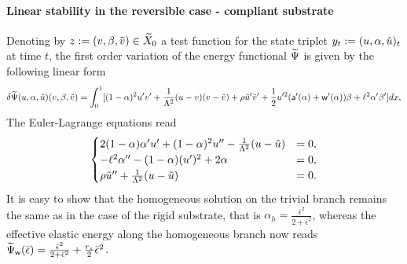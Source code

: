  \paragraph{Linear stability in the reversible case - compliant substrate}



Denoting by $z:=(v, \beta, \tilde v)\in \widetilde{X}_0$ a test function for the state triplet  $y_t:=(u, \alpha, \tilde u)_t$ at time $t$, the first order variation of the energy functional $\widetilde\Psi$ is given by the following linear form 
\begin{equation}
\delta \widetilde\Psi(u, \alpha, \tilde u)(v,\beta,\tilde v)=\int_0^1 [(1-\alpha)^2u'v'+\frac{1}{\Lambda^2} (u- v) (v- \tilde v)+\rho \tilde u'\tilde v'+\frac{1}{2}u'^2 (\mathsf{a}'(\alpha)+\mathsf{w}'(\alpha))\beta+\ell^2\alpha'\beta' ]dx,\label{firstvar}
\end{equation}
The Euler-Lagrange equations read
\begin{eqnarray}
\label{modeld_el_1}
\begin{cases}
  2(1-\alpha)\alpha' u' +(1-\alpha)^2 u'' -  \frac{1}{\Lambda^2}(u-\tilde u) &= 0, \\
  -\ell^2\alpha'' - (1-\alpha)( u')^2 + 2\alpha   &= 0,\\
    \rho  \tilde u''  +  \frac{1}{\Lambda^2}(u-\tilde u) &= 0. \\
\end{cases}
\label{auto2}
\end{eqnarray}
It is easy to show that the homogeneous solution on the trivial branch remains the same as in the case of the rigid substrate, that is $\alpha_h = \frac{\bar{\epsilon}^2}{2 + \bar{\epsilon}^2}\label{eq:homo11}$, whereas the effective elastic energy along the homogeneous branch now reads $\widetilde\Psi_{\mathsf{w}}(\bar{\epsilon}) = \frac{\bar{\epsilon}^2}{2 + \bar{\epsilon}^2} + \frac{r_s}{2}\bar{\epsilon}^2$. 

